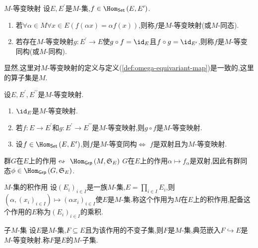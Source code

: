 \begin{definition}{$M$-等变映射}{}
	设$E,E^{\prime}$是$M$-集,$f\in\Hom_{\mathsf{Set}}\left(E,E^{\prime}\right)$.
	\begin{enumerate}
		\item 若$\forall\alpha\in M\forall x\in E\left(f\left(\alpha x\right)=\alpha f\left(x\right)\right)$,则称$f$是$M$-等变映射(或$M$-同态).
		\item 若存在$M$-等变映射$g:E^{\prime}\to E$使$g\circ f=\id_{E}$且$f\circ g=\id_{E^{\prime}}$,则称$f$是$M$-等变同构(或$M$-同构).
	\end{enumerate}
\end{definition}

显然,这里对$M$-等变映射的定义与定义(\ref{def:omega-equivariant-map})是一致的,这里的算子集是$M$.

\begin{proposition}{}{}
	设$E,E^{\prime},E^{\prime\prime}$是$M$-等变映射.
	\begin{enumerate}
		\item $\id_{E}$是$M$-等变映射.
		\item 若$f:E\to E^{\prime}$和$g:E^{\prime}\to E^{\prime\prime}$是$M$-等变映射,则$g\circ f$是$M$-等变映射.
		\item 设$f\in\Hom_{\mathsf{Set}}\left(E,E^{\prime}\right)$,则$f$是$M$-等变同构$\iff$ $f$是双射且为$M$-等变映射.
	\end{enumerate}
\end{proposition}

\begin{proposition}{群$G$在$E$上的作用$\leftrightsquigarrow$ $\Hom_{\mathsf{Grp}}\left(M,\mathfrak{S}_{E}\right)$}{}
	$G$在$E$上的作用$\alpha\mapsto f_{\alpha}$是双射,因此有群同态$\phi\in\Hom_{\mathsf{Grp}}\left(G,\mathfrak{S}_{E}\right)$.
\end{proposition}

\begin{proposition}{$M$-集的积作用}{}
	设$\left(E_{i}\right)_{i\in I}$是一族$M$-集,$E=\prod\limits_{i\in I}E_{i}$,则$\left(\alpha,\left(x_{i}\right)_{i\in I}\right)\mapsto\left(\alpha x_{i}\right)_{i\in I}$使$E$是$M$-集.称这个作用为$M$在$E$上的积作用,配备这个作用的$E$称为$\left(E_{i}\right)_{i\in I}$的乘积.
\end{proposition}

\begin{proposition}{子$M$-集}{}
	设$E$是$M$-集,$F\subseteq E$且为该作用的不变子集,则$F$是$M$-集,典范嵌入$F\hookrightarrow E$是$M$-等变映射.称$F$是$E$的$M$-子集.
\end{proposition}

